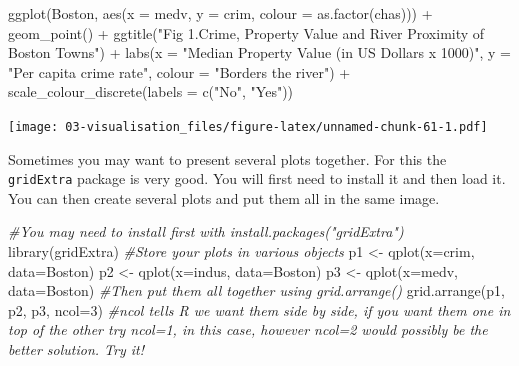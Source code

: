 \documentclass[
]{book}
\newenvironment{Shaded}{\begin{snugshade}}{\end{snugshade}}
\newcommand{\AttributeTok}[1]{\textcolor[rgb]{0.77,0.63,0.00}{#1}}
\newcommand{\CommentTok}[1]{\textcolor[rgb]{0.56,0.35,0.01}{\textit{#1}}}
\newcommand{\DecValTok}[1]{\textcolor[rgb]{0.00,0.00,0.81}{#1}}
\newcommand{\FunctionTok}[1]{\textcolor[rgb]{0.00,0.00,0.00}{#1}}
\newcommand{\NormalTok}[1]{#1}
\newcommand{\OtherTok}[1]{\textcolor[rgb]{0.56,0.35,0.01}{#1}}
\newcommand{\SpecialCharTok}[1]{\textcolor[rgb]{0.00,0.00,0.00}{#1}}
\newcommand{\StringTok}[1]{\textcolor[rgb]{0.31,0.60,0.02}{#1}}
\begin{document}
\begin{Shaded}
\begin{Highlighting}[]
\FunctionTok{ggplot}\NormalTok{(Boston, }\FunctionTok{aes}\NormalTok{(}\AttributeTok{x =}\NormalTok{ medv, }\AttributeTok{y =}\NormalTok{ crim, }\AttributeTok{colour =} \FunctionTok{as.factor}\NormalTok{(chas))) }\SpecialCharTok{+}
  \FunctionTok{geom\_point}\NormalTok{() }\SpecialCharTok{+}
  \FunctionTok{ggtitle}\NormalTok{(}\StringTok{"Fig 1.Crime, Property Value and River Proximity of Boston Towns"}\NormalTok{) }\SpecialCharTok{+}
  \FunctionTok{labs}\NormalTok{(}\AttributeTok{x =} \StringTok{"Median Property Value (in US Dollars x 1000)"}\NormalTok{,}
       \AttributeTok{y =} \StringTok{"Per capita crime rate"}\NormalTok{,}
       \AttributeTok{colour =} \StringTok{"Borders the river"}\NormalTok{) }\SpecialCharTok{+}
  \FunctionTok{scale\_colour\_discrete}\NormalTok{(}\AttributeTok{labels =} \FunctionTok{c}\NormalTok{(}\StringTok{"No"}\NormalTok{, }\StringTok{"Yes"}\NormalTok{))}
\end{Highlighting}
\end{Shaded}

\texttt{[image: 03-visualisation\_files/figure-latex/unnamed-chunk-61-1.pdf]}

Sometimes you may want to present several plots together. For this the \texttt{gridExtra} package is very good. You will first need to install it and then load it. You can then create several plots and put them all in the same image.

\begin{Shaded}
\begin{Highlighting}[]
\CommentTok{\#You may need to install first with install.packages("gridExtra")}
\FunctionTok{library}\NormalTok{(gridExtra)}
\CommentTok{\#Store your plots in various objects}
\NormalTok{p1 }\OtherTok{\textless{}{-}} \FunctionTok{qplot}\NormalTok{(}\AttributeTok{x=}\NormalTok{crim, }\AttributeTok{data=}\NormalTok{Boston)}
\NormalTok{p2 }\OtherTok{\textless{}{-}} \FunctionTok{qplot}\NormalTok{(}\AttributeTok{x=}\NormalTok{indus, }\AttributeTok{data=}\NormalTok{Boston)}
\NormalTok{p3 }\OtherTok{\textless{}{-}} \FunctionTok{qplot}\NormalTok{(}\AttributeTok{x=}\NormalTok{medv, }\AttributeTok{data=}\NormalTok{Boston)}
\CommentTok{\#Then put them all together using grid.arrange()}
\FunctionTok{grid.arrange}\NormalTok{(p1, p2, p3, }\AttributeTok{ncol=}\DecValTok{3}\NormalTok{) }\CommentTok{\#ncol tells R we want them side by side, if you want them one in top of the other try ncol=1, in this case, however ncol=2 would possibly be the better solution. Try it!}
\end{Highlighting}
\end{Shaded}
\end{document}
